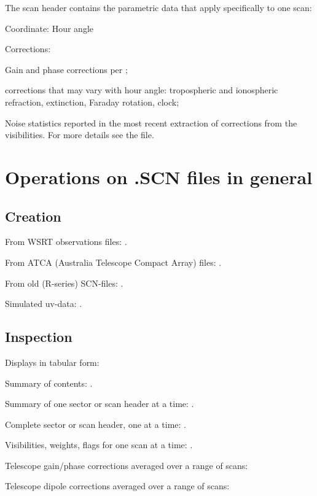         The scan header contains the parametric data that apply specifically to
one scan: 

\bi 
\item   Coordinate: Hour angle 
\item   Corrections: 
  \bi 
  \item   Gain and phase corrections per 
          ; 
  \item   {} corrections that may vary with 
          hour angle: tropospheric and ionospheric refraction, extinction, 
          Faraday rotation, clock; 
  \ei 
\item   Noise statistics reported in the most recent 
         extraction of corrections from 
        the visibilities. 
\ei For more details see the  file. 


\section{ Operations on .SCN files in general} 
\label{.operations} 

\subsection{ Creation } 
\label{.creation} 

\bi 
\item   From WSRT observations files: . 
\item   From ATCA (Australia Telescope Compact Array) files: . 
\item   From old (R-series) SCN-files: . 
\item   Simulated uv-data: . 
\ei 


\subsection{ Inspection } 
\label{.inspect} 

Displays in tabular form: 
\bi 
\item   Summary of contents: . 
\item   Summary of one sector or scan header at a time: . 
\item   Complete sector or scan header, one at a time: . 
\item   Visibilities, weights, flags for one scan at a time: . 
\item   Telescope gain/phase corrections averaged over a range of scans: 
\item   Telescope dipole corrections averaged over a range of scans: 
\ei 

